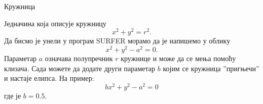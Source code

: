 \documentclass[sr]{./../../common/SurferDesc}%
\begin{document}
\footnotesize
%


\begin{surferPage}
  \begin{surferTitle}Кружница\end{surferTitle}
   \begin{surferText}
   
Једначина која описује кружницу 
\[x^2+y^2=r^2.\]
Да бисмо је унели у програм SURFER морамо да је напишемо у облику
\[x^2+y^2-a^2=0.\]
Параметар $a$ означава полупречник $r$ кружнице и може да се мења помоћу клизача. Сада можете да додате други параметар $b$ којим се кружница ''пригњечи'' и настаје елипса. На пример:
\[bx^2+y^2-a^2=0\] где је $b=0.5$.


     \end{surferText}
\end{surferPage}
\end{document}
